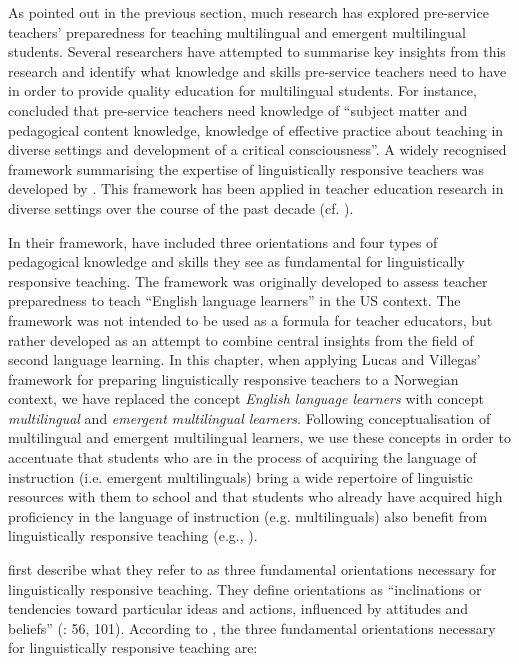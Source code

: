 \documentclass[output=paper]{langscibook}
\begin{document}
As pointed out in the previous section, much research has explored pre-service teachers’ preparedness for teaching multilingual and emergent multilingual students. Several researchers have attempted to summarise key insights from this research and identify what knowledge and skills pre-service teachers need to have in order to provide quality education for multilingual students. For instance, \citet{HowardAleman2008} concluded that pre-service teachers need knowledge of “subject matter and pedagogical content knowledge, knowledge of effective practice about teaching in diverse settings and development of a critical consciousness”. A widely recognised framework summarising the expertise of linguistically responsive teachers was developed by \citet{LucasVillegas2013}. This framework has been applied in teacher education research in diverse settings over the course of the past decade (cf. \citealt{chapters/7_alisaari, chapters/8_heikkola, TandonEtAl2017}).

In their framework, \citet{LucasVillegas2013} have included three orientations and four types of pedagogical knowledge and skills they see as fundamental for linguistically responsive teaching. The framework was originally developed to assess teacher preparedness to teach “English language learners” in the US context. The framework was not intended to be used as a formula for teacher educators, but rather developed as an attempt to combine central insights from the field of second language learning. In this chapter, when applying Lucas and Villegas’ framework for preparing linguistically responsive teachers to a Norwegian context, we have replaced the concept \textit{English language learners} with  concept \textit{multilingual} and \textit{emergent multilingual learners}. Following  conceptualisation of multilingual and emergent multilingual learners, we use these concepts in order to accentuate that students who are in the process of acquiring the language of instruction (i.e. emergent multilinguals) bring a wide repertoire of linguistic resources with them to school and that students who already have acquired high proficiency in the language of instruction (e.g. multilinguals) also benefit from linguistically responsive teaching (e.g., \citealt{Garcia2009}).  

\citet[101]{Lucas2013-3} first describe what they refer to as three fundamental orientations necessary for linguistically responsive teaching. They define orientations as “inclinations or tendencies toward particular ideas and actions, influenced by attitudes and beliefs” (\citealt{LucasVillegas2011}: 56, 101). According to \citet[101]{LucasVillegas2013}, the three fundamental orientations necessary for linguistically responsive teaching are:
\end{document}
